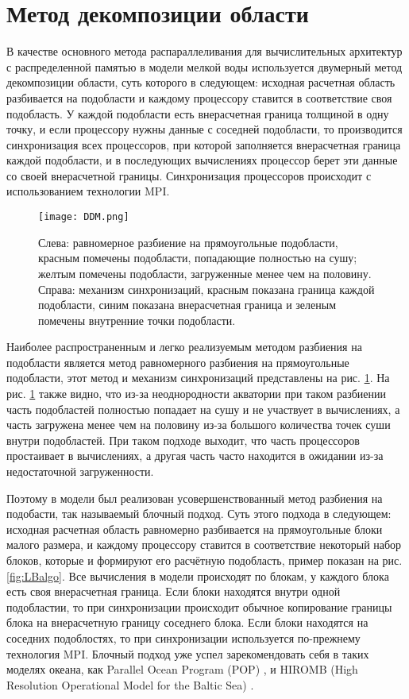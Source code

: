 \section{Метод декомпозиции области}\label{sec:ch2/sec2}

В качестве основного метода распараллеливания для вычислительных архитектур с распределенной памятью в модели мелкой воды используется двумерный метод декомпозиции области,
суть которого в следующем: исходная расчетная область разбивается на подобласти и каждому процессору ставится в соответствие своя подобласть.
У каждой подобласти есть внерасчетная граница толщиной в одну точку, и если процессору нужны данные с соседней подобласти,
то производится синхронизация всех процессоров, при которой заполняется внерасчетная граница каждой подобласти,
и в последующих вычислениях процессор берет эти данные со своей внерасчетной границы. Синхронизация процессоров происходит с использованием технологии MPI.

\begin{figure}[htb!]
    \center
    \texttt{[image: DDM.png]}
    \caption{Слева: равномерное разбиение на прямоугольные подобласти, красным помечены подобласти, попадающие полностью на сушу;
    желтым помечены подобласти, загруженные менее чем на половину. Справа: механизм синхронизаций, красным показана граница каждой подобласти,
    синим показана внерасчетная граница и зеленым помечены внутренние точки подобласти.}
    \label{fig:ddm}
\end{figure}

Наиболее распространенным и легко реализуемым методом разбиения на подобласти является метод равномерного разбиения на прямоугольные подобласти,
этот метод и механизм синхронизаций представлены на рис. \ref{fig:ddm}. На рис. \ref{fig:ddm} также видно,
что из-за неоднородности акватории при таком разбиении часть подобластей полностью попадает на сушу и не участвует в вычислениях,
а часть загружена менее чем на половину из-за большого количества точек суши внутри подобластей.
При таком подходе выходит, что часть процессоров простаивает в вычислениях,
а другая часть часто находится в ожидании из-за недостаточной загруженности.

Поэтому в модели был реализован усовершенствованный метод разбиения на подобасти, так называемый блочный подход.
Суть этого подхода в следующем: исходная расчетная область равномерно разбивается на прямоугольные блоки малого размера,
и каждому процессору ставится в соответствие некоторый набор блоков, которые и формируют его расчётную подобласть, пример показан на рис. \ref{fig:LBalgo}.
Все вычисления в модели происходят по блокам, у каждого блока есть своя внерасчетная граница. Если блоки находятся внутри одной подобластии,
то при синхронизации происходит обычное копирование границы блока на внерасчетную границу соседнего блока. Если блоки находятся на соседних подоблостях,
то при синхронизации используется по-прежнему технология MPI.
Блочный подход уже успел зарекомендовать себя в таких моделях океана, как Parallel Ocean Program (POP) \cite{POP}, \cite{gmd-7-267-2014} и
HIROMB (High Resolution Operational Model for the Baltic Sea) \cite{HIROMB}.


